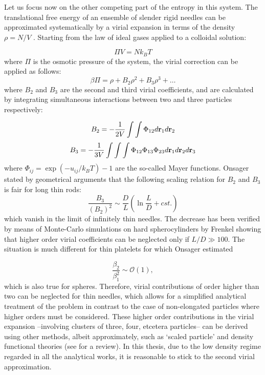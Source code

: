 Let us focus now on the other competing part of the entropy in this system. The translational free energy of an ensemble of slender rigid needles can be approximated systematically by a virial expansion in terms of the density $\rho=N/V$ \cite{hansenmacdonald}. Starting from the law of ideal gases applied to a colloidal solution:

\begin{equation}
\Pi V = N k_B T
\end{equation}
where $\Pi$ is the osmotic pressure of the system, the virial correction can be applied as follows:
\begin{equation}
\beta \Pi = \rho + B_2\rho^2 + B_3\rho^3 + \ldots
\end{equation}
where $B_2$ and $B_3$ are the second and third virial coefficients, and are calculated by integrating simultaneous interactions between two and three particles respectively:

\begin{equation}
B_2 = -\frac{1}{2V} \int \int \Phi_{12} d {\bf r}_1 d {\bf r}_2
 \label{B2}
\end{equation}
\begin{equation}
B_3 = -\frac{1}{3V} \int \int \int \Phi_{12} \Phi_{13} \Phi_{23} d {\bf r}_1 d {\bf r}_2 d {\bf r}_3
\end{equation}
where $\Phi_{ij} = \exp(-u_{ij}/k_BT)-1$ are the so-called Mayer functions. Onsager stated by geometrical arguments that the following scaling relation for $B_2$ and $B_3$ is fair for long thin rods:
\begin{equation}
\frac{B_3}{(B_2)^2} \sim \frac{D}{L}\left ( \ln \frac{L}{D} + cst. \right )
\end{equation}
which vanish in the limit of infinitely thin needles. The decrease  has been  verified by means of Monte-Carlo simulations on hard spherocylinders by Frenkel \cite{Frenkel87,Frenkel87err} showing that higher order virial coefficients can be neglected only if $L/D\gg 100$. The situation is much different for thin platelets for which Onsager estimated

\begin{equation}
\frac{\beta_{2}}{\beta_{1}^{2}}\sim \mathcal{O}(1), \label{0clusterplate}
\end{equation}
which is also true for spheres. Therefore, virial contributions of order higher than two can be neglected for thin needles, which allows for a simplified analytical treatment of the problem in contrast to the case of non-elongated particles where higher orders must be considered. These higher order contributions in the virial expansion --involving clusters of three, four, etcetera particles-- can be derived using other methods, albeit approximately, such as `scaled particle' \cite{Cotterspt,Cotter} and density functional theories (see \cite{Vroege92,DFTspecialJPCM} for a review). In this thesis, due to the low density regime regarded in all the analytical works, it is reasonable to stick to the second virial approximation.

